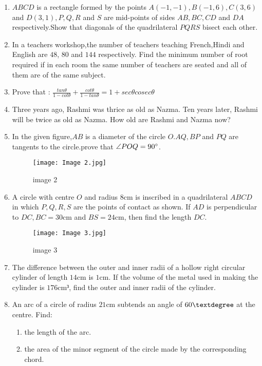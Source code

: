 \documentclass{article}
\providecommand{\brak}[1]{\ensuremath{\left(#1\right)}}
\begin{document}
\begin{enumerate}
\item $ABCD$ is a rectangle formed by the points $ A\brak{-1,-1}, B\brak{-1, 6}, C\brak{3, 6}$ and $D\brak{3, 1}, P, Q, R$ and $S$ are mid-points of sides $AB, BC, CD$ and $DA$ respectively.Show that diagonals of the quadrilateral $PQRS$ bisect each other.
\item\text{} In a teachers workshop,the number of teachers teaching French,Hindi and English are $48$, $80$ and $144$ respectively. Find the minimum number of root required if in each room the same number of teachers are seated and all of them are of the same subject.
\item Prove that : $\frac{tan{\theta}}{1-cot{\theta}} + \frac{cot{\theta}}{1-tan{\theta}} = 1 + sec\theta cosec\theta$
\item Three years ago, Rashmi was thrice as old as Nazma. Ten years later, Rashmi will be twice as old as Nazma. How old are Rashmi and Nazma now?
\item In the given figure,$AB$ is a diameter of the circle $O. AQ, BP$ and $PQ$ are tangents to the circle.prove that $\angle POQ = 90\degree$.
\begin{figure}[!ht]
\centering
\texttt{[image: Image 2.jpg]}
\label{fig:Image 2}
\caption{image 2}
\end{figure}
\newpage
\item  A circle with centre $O$ and radius $8\mathrm{cm}$ is inscribed in a quadrilateral $ABCD$ in which $P, Q, R, S$ are the points of contact as shown. If $AD$ is perpendicular to $DC, BC = 30\mathrm{cm}$ and $BS = 24\mathrm{cm}$, then find the length $DC$.
\begin{figure}[!ht]
\centering
\texttt{[image: Image 3.jpg]}
\label{fig:Image 3}
\caption{image 3}
\end{figure}
\item The difference between the outer and inner radii of a hollow right circular cylinder of length $14\mathrm{cm}$ is $1\mathrm{cm}$. If the volume of the metal used in making the cylinder is $176\mathrm{cm³}$, find the outer and inner radii of the cylinder.
\newpage
\item An arc of a circle of radius $21\mathrm{cm}$ subtends an angle of $60\textdegree$ at the centre. Find:\\
\begin{enumerate}
\item\text the length of the arc.
\item \text the area of the minor segment of the circle made by the corresponding chord.

\end{enumerate}
\end{enumerate}
\end{document}
